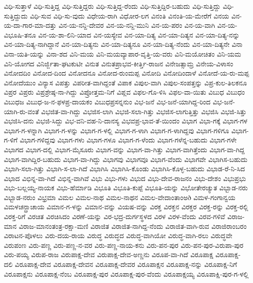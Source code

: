 ವಿಧಿ-ಸುತ್ತಾಳೆ
ವಿಧಿ-ಸುತ್ತಿದ್ದ
ವಿಧಿ-ಸುತ್ತಿದ್ದರು
ವಿಧಿ-ಸುತ್ತಿದ್ದ-ರೆಂದು
ವಿಧಿ-ಸುತ್ತಿದ್ದಿರ-ಬಹುದು
ವಿಧಿ-ಸುತ್ತಿದ್ದು
ವಿಧಿ-ಸುತ್ತಿದ್ದುದು
ವಿಧಿ-ಸುವ
ವಿಧಿ-ಸು-ವುದು
ವಿಧೇಯ-ರಾಗಿ
ವಿಧೋರ-ಲಗ
ವಿನಂತಿ
ವಿನಂತಿ-ಯ-ಮೇರೆಗೆ
ವಿನಯ
ವಿನ-ಯ-ದಾ-ಗಾರ-ಮಾ-ದತ್ತು
ವಿನ-ಯ-ನನ್ದಿ-ದೇವರ
ವಿನ-ಯ-ನನ್ದಿ-ಮುನಿ
ವಿನ-ಯ-ಪರಂ
ವಿನ-ಯ-ವಾಗಿ
ವಿನ-ಯ-ವಿಭೂಷಿ-ತನೂ
ವಿನ-ಯ-ಶಾ-ಲಿನಿ-ಯಾದ
ವಿನ-ಯಸ್ಯೇವ
ವಿನ-ಯಾ-ದಿತ್ಯ
ವಿನ-ಯಾ-ದಿತ್ಯನ
ವಿನ-ಯಾ-ದಿತ್ಯ-ನನ್ನು
ವಿನ-ಯಾ-ದಿತ್ಯ-ನಾಗಿದ್ದಾನೆ
ವಿನ-ಯಾ-ದಿತ್ಯನು
ವಿನ-ಯಾ-ದಿತ್ಯನೂ
ವಿನ-ಯಾ-ದಿತ್ಯ-ನೆಂದು
ವಿನ-ಯಾ-ದಿತ್ಯನೇ
ವಿನಾ
ವಿನಾ-ಯತಿ-ಯನ್ನು
ವಿನಾ-ಶದ
ವಿನಿ-ಮಯ
ವಿನಿ-ಮಯವ್ಯಾಪಾರ-ವೃತ್ತಿ-ಯ-ವರು
ವಿನಿ-ಮಯೋಚಿತಂ
ವಿನಿ-ಯಮ
ವಿನಿ-ಯೋಗದ
ವಿನಿರ್ಜ್ಜಿತಾ-ಘಟಕುಟೀ
ವಿನುತ
ವಿನುತಪ್ರಾಭವ-ಕೀರ್ತ್ತಿ-ರಾಜನ
ವಿನೇಜತ್ಸಾಮ್ರ
ವಿನೇಯ-ವಿಳಾಸಂ
ವಿನೋದದಿಂ
ವಿನೋದ-ದಿಂದ
ವಿನೋದನೂ
ವಿನೋದ-ರುಂಮಪ್ಪ
ವಿನೋದಿ
ವಿನೋದಿಂದಾಳೆ
ವಿನೋದೆ-ಯ-ರು-ಮಪ್ಪ
ವಿನೋದೆಯುಂ
ವಿನ್ಯಾಸ
ವಿಪತ್ತು
ವಿಪರೀತ-ವಾಗಿದ್ದಂತೆ
ವಿಪಾಕ
ವಿಪುಲ-ವಾಗಿ
ವಿಪುಲ-ಸಂಪತ್ತನ್ನು
ವಿಪ್ರ-ಕುಲ-ತಿಲಕನೂ
ವಿಪ್ರರ
ವಿಪ್ರರು
ವಿಪ್ರಶ್ರೇಷ್ಠ-ನಾ-ಗಿದ್ದು
ವಿಪ್ರೋತ್ತಮ-ನಿಗೆ
ವಿಪ್ಲವ
ವಿಫಲ-ಗೊ-ಳಿಸಿ
ವಿಫಲ-ವಾ-ಯಿತು
ವಿಬುಧ
ವಿಬುಧಂ
ವಿಬುಧಜ
ವಿಬುಧ-ಜ-ನ-ಫಳಪ್ರ-ದಾಯಕಂ
ವಿಬುಧಪ್ರಸನ್ನನುಂ
ವಿಭ-ಜನೆ
ವಿಭ-ಜನೆ-ಯಾಗಿದ್ದ-ರಿಂದ
ವಿಭ-ಜನೆ-ಯಾಗಿ-ರು-ವಂತೆ
ವಿಭಜಿತ-ವಾ-ಗಿದ್ದು
ವಿಭಜಿಸ-ಲಾಗಿ
ವಿಭಜಿ-ಸಲಾ-ಗಿತ್ತು
ವಿಭಜಿಸ-ಲಾಗುತ್ತಿತ್ತು
ವಿಭಜಿಸಿ
ವಿಭಜಿ-ಸಿತ್ತು
ವಿಭಜಿಸಿ-ದನು
ವಿಭಜಿ-ಸಿದ್ದು
ವಿಭ-ವನಿ-ವಹ-ನಿ-ದಾನಸ್ಯ
ವಿಭವಪ್ರ-ಭಾವ-ತೆ-ಯಿಂದಂ
ವಿಭಾಗ
ವಿಭಾ-ಗಕ್ಕೆ
ವಿಭಾಗ-ಗಳ
ವಿಭಾಗ-ಗ-ಳನ್ನಾಗಿ
ವಿಭಾಗ-ಗ-ಳನ್ನು
ವಿಭಾಗ-ಗ-ಳಲ್ಲಿ
ವಿಭಾಗ-ಗ-ಳಾಗಿ
ವಿಭಾಗ-ಗ-ಳಾಗಿದ್ದವು
ವಿಭಾಗ-ಗಳಿಗೂ
ವಿಭಾಗ-ಗ-ಳಿಗೆ
ವಿಭಾಗ-ಗಳಿದ್ದವು
ವಿಭಾಗ-ಗಳು
ವಿಭಾಗ-ಗಳೂ
ವಿಭಾಗ-ಗ-ಳೆಂದು
ವಿಭಾಗ-ಗಳೆನ್ನ-ಬಹುದು
ವಿಭಾಗ-ಗಳೇ
ವಿಭಾಗದ
ವಿಭಾಗ-ದಲ್ಲಿ
ವಿಭಾಗ-ಮೈಸೂರು
ವಿಭಾಗ-ವನ್ನು
ವಿಭಾಗ-ವಾ-ಗಿತ್ತು
ವಿಭಾಗ-ವಾಗಿತ್ತೆಂದು
ವಿಭಾಗ-ವಾ-ಗಿದ್ದ
ವಿಭಾಗ-ವಾಗಿದ್ದಿರ-ಬಹುದು
ವಿಭಾಗ-ವಾ-ಗಿದ್ದು
ವಿಭಾಗವು
ವಿಭಾಗವೂ
ವಿಭಾಗ-ವೆಂದು
ವಿಭಾಗವೇ
ವಿಭಾಗಿಸ-ಬಹುದು
ವಿಭಾಗಿ-ಸಲಾ-ಗಿತ್ತು
ವಿಭಾಗಿ-ಸ-ಲಾ-ಗಿದೆ
ವಿಭಾಗಿಸಿ
ವಿಭಾಗಿಸಿ-ಕೊಂಡು
ವಿಭಾಗಿಸಿ-ಕೊಳ್ಳ-ಬಹುದು
ವಿಭಾಡ-ರೆ-ನಿ-ಸಿದ
ವಿಭಾದ
ವಿಭಿನ್ನ-ವಾ-ಗಿದೆ
ವಿಭಿನ್ನ-ವಾಗಿವೆ
ವಿಭು
ವಿಭು-ಗಳು
ವಿಭುದ
ವಿಭು-ದೇವ-ರಾಜನಂ
ವಿಭು-ದೇಶಂ
ವಿಭುಪ್ರಭು
ವಿಭು-ಬಲ್ಲಯ್ಯ-ನಾಯಕ
ವಿಭು-ಹೆರ್ಮಾಡಿ
ವಿಭೂತಿ
ವಿಭೂತಿ-ಕುಪ್ಪೆ
ವಿಭೂತಿ-ಯನ್ನು
ವಿಭೋತೇರಚ್ಯುತ
ವಿಭ್ಬಾಡ-ನರು
ವಿಭ್ಬಾಡ-ನರುಂ
ವಿಭ್ರಮಾ
ವಿಮಲ
ವಿಮಲ-ನಾಥ
ವಿಮಲ-ನಾಥನ
ವಿಮಲ-ವೇದಾಂತಾಂಅð
ವಿಮಳ-ಗಂಗಾನ್ವಯ
ವಿಮಳಚನ್ದ್ರಾಚಾಯ
ವಿಮಾನ-ಗ-ಳನ್ನು
ವಿಮಾನ-ವನ್ನು
ವಿಯಷ-ವನ್ನು
ವಿರಕ್ತ
ವಿರಕ್ತನ
ವಿರಕ್ತರ
ವಿರಕ್ತ-ರನ್ನು
ವಿರಕ್ತ-ರಲ್ಲಿ
ವಿರಕ್ತ-ರಿಗೆ
ವಿರಚಿತ
ವಿರಚಿಸಿದಂ
ವಿರಣೆ-ಯನ್ನು
ವಿರ-ಭದ್ರ-ದುರ್ಗಸ್ಥಳದ
ವಿರಳ
ವಿರಳ-ವೆಂದು
ವಿರವ-ಗಳಿವೆ
ವಿರಾಜ-ಮಾನ
ವಿರಾಜ-ಮಾನಂತಂತ್ರ-ರಕ್ಷಾ-ಮಣಿ
ವಿರಾಜಿತ
ವಿರಾಜಿತ-ನಾಗಿದ್ದ-ನೆಂದು
ವಿರಾಜಿತ-ವಾಗಿ-ರುವ
ವಿರಾಜಿರಾಂಬರಂ
ವಿರಾಟನ-ಪೊಳಲು
ವಿರು-ದಯ-ರಾಯ
ವಿರುದ್ಧ
ವಿರುದ್ಧದ
ವಿರುದ್ಧ-ವಾಗಿಯೋ
ವಿರುದ್ಧ-ವಾಗಿ-ರಲು
ವಿರುದ್ಧವೇ
ವಿರುಪಂಣ
ವಿರು-ಪಣ್ಣ
ವಿರು-ಪಣ್ಣ-ನ-ವರ
ವಿರು-ಪಣ್ಣ-ನಾಯ-ಕನು
ವಿರು-ಪನ-ಪುರ
ವಿರು-ಪನ-ಪುರ-ವಿರುಪಾ-ಪುರ
ವಿರು-ಪಯ್ಯ
ವಿರುಪ-ರಾಜ
ವಿರುಪಾಕ್ಷ-ದೇವ
ವಿರುಪಾಕ್ಷ-ದೇವ-ಅಣ್ಣನು
ವಿರೂಪ-ವಾ-ಗಿದೆ
ವಿರೂಪಾಕ್ಷ
ವಿರೂಪಾಕ್ಷ-ದಲಿ
ವಿರೂಪಾಕ್ಷ-ದೇವ
ವಿರೂಪಾಕ್ಷ-ದೇವನ
ವಿರೂಪಾಕ್ಷ-ದೇವರ
ವಿರೂಪಾಕ್ಷನ
ವಿರೂಪಾಕ್ಷ-ನನ್ನು
ವಿರೂಪಾಕ್ಷ-ನಿಗೆ
ವಿರೂಪಾಕ್ಷನು
ವಿರೂಪಾಕ್ಷ-ನೆಂಬ
ವಿರೂಪಾಕ್ಷ-ಪುರ
ವಿರೂಪಾಕ್ಷ-ಪುರ-ವೆಂದು
ವಿರೂಪಾಕ್ಷಯ್ಯ
ವಿರೂಪಾಕ್ಷಿ-ಪುರ-ಗ-ಳಲ್ಲಿ
